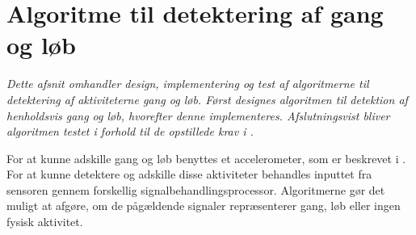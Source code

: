 \section{Algoritme til detektering af gang og løb}\label{sec:algogangloeb}
\textit{Dette afsnit omhandler design, implementering og test af algoritmerne til detektering af aktiviteterne gang og løb. Først designes algoritmen til detektion af henholdsvis gang og løb, hvorefter denne implementeres. Afslutningsvist bliver algoritmen testet i forhold til de opstillede krav i .} 

For at kunne adskille gang og løb benyttes et accelerometer, som er beskrevet i . For at kunne detektere og adskille disse aktiviteter behandles inputtet fra sensoren gennem forskellig signalbehandlingsprocessor. Algoritmerne gør det muligt at afgøre, om de pågældende signaler repræsenterer gang, løb eller ingen fysisk aktivitet. 

